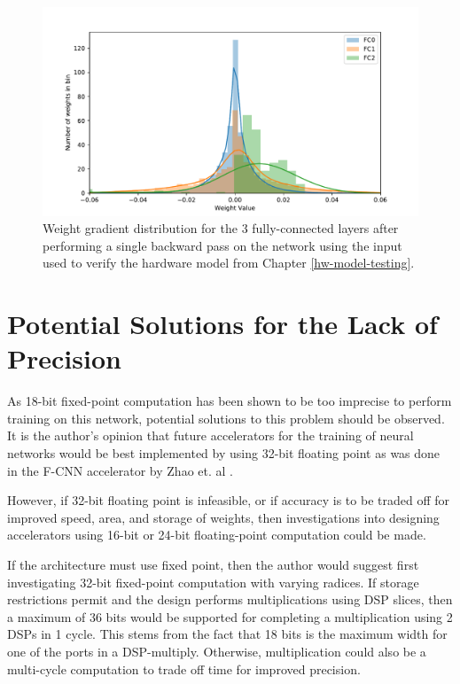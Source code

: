 \begin{figure}
	\centering 
	\includegraphics[width=\textwidth]{figures/weight_distrib}
	\caption{Weight gradient distribution for the 3 fully-connected layers after performing a single backward pass on the network using the input used to verify the hardware model from Chapter \ref{hw-model-testing}.}
	\label{weight-distrib}
\end{figure}

\section{Potential Solutions for the Lack of Precision}
As 18-bit fixed-point computation has been shown to be too imprecise to perform training on this network, potential solutions to this problem should be observed. It is the author's opinion that future accelerators for the training of neural networks would be best implemented by using 32-bit floating point as was done in the F-CNN accelerator by Zhao et. al \cite{FCNN}. 

However, if 32-bit floating point is infeasible, or if accuracy is to be traded off for improved speed, area, and storage of weights, then investigations into designing accelerators using 16-bit or 24-bit floating-point computation could be made.

If the architecture must use fixed point, then the author would suggest first investigating 32-bit fixed-point computation with varying radices. If storage restrictions permit and the design performs multiplications using DSP slices, then a maximum of 36 bits would be supported for completing a multiplication using 2 DSPs in 1 cycle. This stems from the fact that 18 bits is the maximum width for one of the ports in a DSP-multiply. Otherwise, multiplication could also be a multi-cycle computation to trade off time for improved precision.

